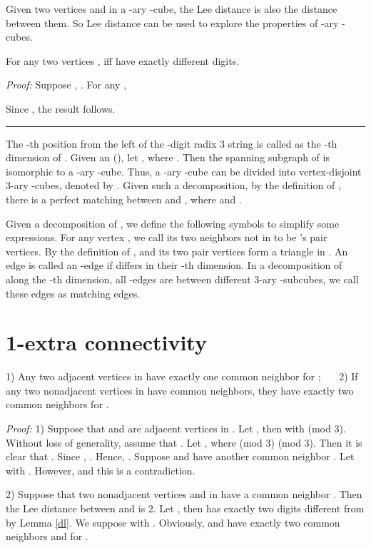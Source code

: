\documentclass[preprint,number,12pt]{elsarticle}
\begin{document}
Given two vertices  and  in a -ary -cube, the Lee distance  is also the distance between them. So Lee distance can be used to explore the properties of -ary -cubes.

\begin{lem}\label{dl}
For any two vertices ,  iff  have exactly  different digits.
\end{lem}
\emph{Proof:}  Suppose , .
For any ,

Since ,  the result follows. \hfill\rule{1mm}{2mm}

The -th position from the left of the -digit radix 3 string  is called as the -th dimension of .
Given an (), let , where . Then the spanning subgraph of  is isomorphic to a -ary -cube. Thus, a -ary -cube can be divided into  vertex-disjoint 3-ary -cubes, denoted by .
Given such a decomposition, by the definition of , there is a perfect matching between
 and , where 
and .

Given a decomposition of , we define the following symbols to simplify some expressions.
For any vertex , we call its two neighbors not in   to be 's pair vertices. By the definition of ,  and its two pair vertices form a triangle in .  An edge  is called an -edge if  differs in their -th dimension. In a decomposition of  along the -th dimension, all -edges are between different 3-ary -subcubes, we call these edges as matching edges.

\section{1-extra connectivity}\label{S3:SSG}

\begin{lem}\label{l1}
1) Any two adjacent vertices in  have exactly one common neighbor for ; \ \ \  2) If any two nonadjacent vertices in  have common neighbors, they have exactly two common neighbors for .
\end{lem}
\emph{Proof:}
1) Suppose that  and  are adjacent vertices in . Let , then  with  (mod 3). Without loss of generality, assume that . Let , where  (mod 3)  (mod 3). Then it is clear that . Since , . Hence, . Suppose  and  have another common neighbor . Let  with . However,  and this is a contradiction.

2) Suppose that two nonadjacent vertices  and  in  have a common neighbor . Then the Lee distance between  and  is 2.  Let , then  has exactly two digits different from  by Lemma \ref{dl}. We suppose   with . Obviously,  and  have exactly two common neighbors  and  for . 
\end{document}
